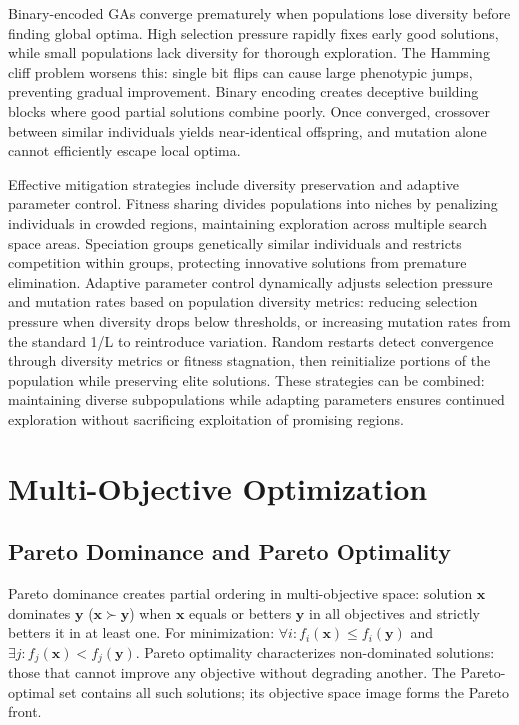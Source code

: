 \documentclass[journal,12pt,onecolumn]{IEEEtran}
\begin{document}
Binary-encoded GAs converge prematurely when populations lose diversity before finding global optima. High selection pressure rapidly fixes early good solutions, while small populations lack diversity for thorough exploration. The Hamming cliff problem worsens this: single bit flips can cause large phenotypic jumps, preventing gradual improvement. Binary encoding creates deceptive building blocks where good partial solutions combine poorly. Once converged, crossover between similar individuals yields near-identical offspring, and mutation alone cannot efficiently escape local optima.

Effective mitigation strategies include diversity preservation and adaptive parameter control. Fitness sharing divides populations into niches by penalizing individuals in crowded regions, maintaining exploration across multiple search space areas. Speciation groups genetically similar individuals and restricts competition within groups, protecting innovative solutions from premature elimination. Adaptive parameter control dynamically adjusts selection pressure and mutation rates based on population diversity metrics: reducing selection pressure when diversity drops below thresholds, or increasing mutation rates from the standard 1/L to reintroduce variation. Random restarts detect convergence through diversity metrics or fitness stagnation, then reinitialize portions of the population while preserving elite solutions. These strategies can be combined: maintaining diverse subpopulations while adapting parameters ensures continued exploration without sacrificing exploitation of promising regions.

\section{Multi-Objective Optimization}

\subsection{Pareto Dominance and Pareto Optimality}

Pareto dominance creates partial ordering in multi-objective space: solution $\mathbf{x}$ dominates $\mathbf{y}$ ($\mathbf{x} \succ \mathbf{y}$) when $\mathbf{x}$ equals or betters $\mathbf{y}$ in all objectives and strictly betters it in at least one. For minimization: $\forall i: f_i(\mathbf{x}) \leq f_i(\mathbf{y})$ and $\exists j: f_j(\mathbf{x}) < f_j(\mathbf{y})$. Pareto optimality characterizes non-dominated solutions: those that cannot improve any objective without degrading another. The Pareto-optimal set contains all such solutions; its objective space image forms the Pareto front.
\end{document}
